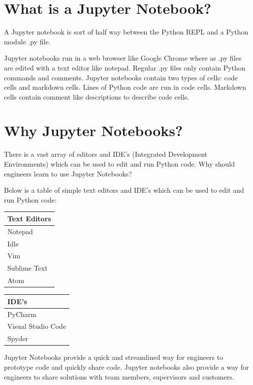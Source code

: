 \documentclass{book}
\begin{document}
    
        \section{What is a Jupyter Notebook?}\label{what-is-a-jupyter-notebook}
    




    
        A Jupyter notebook is sort of half way between the Python REPL and a
Python module .py file.

Jupyter notebooks run in a web browser like Google Chrome where as .py
files are edited with a text editor like notepad. Regular .py files only
contain Python commands and comments. Jupyter notebooks contain two
types of cells: code cells and markdown cells. Lines of Python code are
run in code cells. Markdown cells contain comment like descriptions to
describe code cells.
    




    
        \section{Why Jupyter Notebooks?}\label{why-jupyter-notebooks}
    




    
        There is a vast array of editors and IDE's (Integrated Development
Environments) which can be used to edit and run Python code. Why should
engineers learn to use Jupyter Notebooks?

Below is a table of simple text editors and IDE's which can be used to
edit and run Python code:

\begin{longtable}[]{@{}l@{}}
\toprule
Text Editors\tabularnewline
\midrule
\endhead
Notepad\tabularnewline
Idle\tabularnewline
Vim\tabularnewline
Sublime Text\tabularnewline
Atom\tabularnewline
\bottomrule
\end{longtable}

\begin{longtable}[]{@{}l@{}}
\toprule
IDE's\tabularnewline
\midrule
\endhead
PyCharm\tabularnewline
Visual Studio Code\tabularnewline
Spyder\tabularnewline
\bottomrule
\end{longtable}

Jupyter Notebooks provide a quick and streamlined way for engineers to
prototype code and quickly share code. Jupyter notebooks also provide a
way for engineers to share solutions with team members, supervisors and
customers.
    
\end{document}
